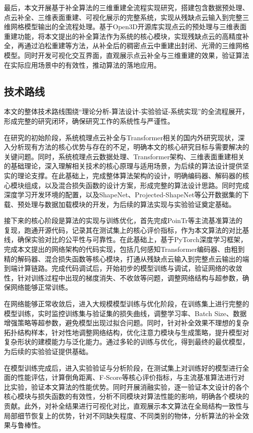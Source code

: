最后，本文开展基于补全算法的三维重建全流程实现研究，搭建包含数据预处理、点云补全、三维表面重建、可视化展示的完整系统，实现从残缺点云输入到完整三维网格模型输出的全流程处理。基于Open3D开源库实现点云的预处理与三维表面重建功能，将本文提出的补全算法作为系统的核心模块，实现残缺点云的高精度补全，再通过泊松重建等方法，从补全后的稠密点云中重建出封闭、光滑的三维网格模型。同时开发可视化交互界面，直观展示点云补全与三维重建的效果，验证算法在实际应用场景中的有效性，推动算法的落地应用。

\subsection{技术路线}
本文的整体技术路线围绕“理论分析-算法设计-实验验证-系统实现”的全流程展开，形成完整的研究闭环，确保研究工作的系统性与严谨性。

在研究的初始阶段，系统梳理点云补全与Transformer相关的国内外研究现状，深入分析现有方法的核心优势与存在的不足，明确本文的核心研究目标与需要解决的关键问题。同时，系统梳理点云数据处理、Transformer架构、三维表面重建相关的基础理论，深入理解相关技术的核心原理与适用场景，为后续的算法设计提供坚实的理论支撑。在此基础上，完成整体算法架构的设计，明确编码器、解码器的核心模块组成，以及混合损失函数的设计方案，形成完整的算法设计思路。同时完成深度学习开发环境的配置，以及ShapeNet、Projected-ShapeNet等公开数据集的下载、预处理与数据加载模块的开发，为后续的算法实现与实验验证奠定基础。

接下来的核心阶段是算法的实现与训练优化，首先完成PoinTr等主流基准算法的复现，跑通开源代码，记录其在测试集上的核心评价指标，作为本文算法的对比基线，确保实验对比的公平性与可靠性。在此基础上，基于PyTorch深度学习框架，完成本文提出的网络架构的代码实现，包括几何感知Transformer编码器、由粗到精的解码器、混合损失函数等核心模块，打通从残缺点云输入到完整点云输出的端到端计算链路。完成代码调试后，开始初步的模型训练与调试，验证网络的收敛性，针对训练过程中出现的梯度消失、不收敛等问题，调整网络结构与超参数，确保网络能够正常训练。

在网络能够正常收敛后，进入大规模模型训练与优化阶段，在训练集上进行完整的模型训练，实时监控训练集与验证集的损失曲线，调整学习率、Batch Size、数据增强策略等超参数，避免模型出现过拟合问题。同时，针对补全效果不理想的复杂拓扑结构样本，针对性地调整网络结构，优化注意力模块与生成策略，提升模型对复杂形状的建模能力与泛化能力。通过多轮的训练与优化，得到最终的最优模型，为后续的实验验证提供基础。

在模型训练完成后，进入实验验证与分析阶段，在测试集上对训练好的模型进行全面的性能评估，计算倒角距离、F-Score等核心评价指标，与主流基准算法进行对比实验，验证本文算法的性能优势。同时开展消融实验，逐一验证本文设计的各个核心模块与损失函数的有效性，分析不同模块对算法性能的影响，明确各个模块的贡献。此外，对补全结果进行可视化对比，直观展示本文算法在全局结构一致性与局部细节恢复上的优势，针对不同缺失程度、不同类别的物体，分析算法的补全效果与鲁棒性。

